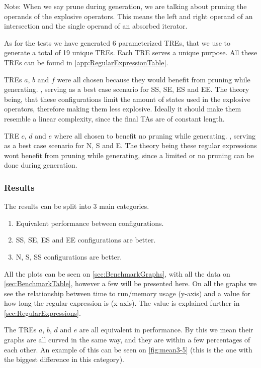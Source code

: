 Note: When we say prune during generation, we are talking about pruning the operands of the explosive operators.
This means the left and right operand of an intersection and the single operand of an absorbed iterator.

As for the tests we have generated 6 parameterized TREs, that we use to generate a total of 19 unique TREs.
Each TRE serves a unique purpose.
All these TREs can be found in \cref{app:RegularExpressionTable}.

TREs $a$, $b$ and $f$ were all chosen because they would benefit from pruning while generating.
, serving as a best case scenario for SS, SE, ES and EE.
The theory being, that these configurations limit the amount of states used in the explosive operators, therefore making them less explosive.
Ideally it should make them resemble a linear complexity, since the final TAs are of constant length.

TRE $c$, $d$ and $e$ where all chosen to benefit no pruning while generating.
, serving as a best case scenario for N, S and E.
The theory being these regular expressions wont benefit from pruning while generating, since a limited or no pruning can be done during generation.

\subsubsection{Results}
The results can be split into 3 main categories.

\begin{enumerate}
    \item Equivalent performance between configurations.
    \item SS, SE, ES and EE configurations are better.
    \item N, S, SS configurations are better.
\end{enumerate}

All the plots can be seen on \cref{sec:BenchmarkGraphs}, with all the data on \cref{sec:BenchmarkTable}, however a few will be presented here.
On all the graphs we see the relationship between time to run/memory usage (y-axis) and a value for how long the regular expression is (x-axis). The value is explained further in \cref{sec:RegularExpressions}.

The TREs $a$, $b$, $d$ and $e$ are all equivalent in performance.
By this we mean their graphs are all curved in the same way, and they are within a few percentages of each other.
An example of this can be seen on \cref{fig:mean3-5} (this is the one with the biggest difference in this category).

